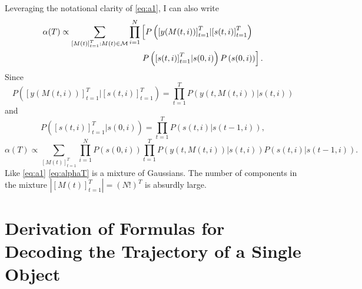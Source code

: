 \documentclass[12pt]{article}
\newcommand{\M}{{\cal M}}
\newcommand{\os}[4]{{\left[ #1(#2) \right]}_{#3}^{#4}} %
\newcommand{\ti}[2]{{#1}{(#2)}}                         %
\newcommand{\ts}[4]{\os{#1}{#2}{#2=#3}{#4}} %
\begin{document}
Leveraging the notational clarity of \eqref{eq:a1}, I can also write
\begin{align*}
  \ti{\alpha}{T} \propto \sum_{\os{M}{t}{t=1}{T}:\ti{M}{t}\in \M}
  \prod_{i=1}^N& \left[
  P\left( \os{y}{\ti{M}{t,i}}{t=1}{T} | \os{s}{t,i}{t=1}{T}\right) \right. \\
  & \left. P\left( \os{s}{t,i}{t=1}{T}| \ti{s}{0,i} \right)
  P\left( \ti{s}{0,i} \right) \right] .
\end{align*}
Since
\begin{equation*}
  P\left( \os{y}{\ti{M}{t,i}}{t=1}{T} | \os{s}{t,i}{t=1}{T}\right) =
  \prod_{t=1}^T P\left( \ti{y}{t,\ti{M}{t,i}} | \ti{s}{t,i}\right)
\end{equation*}
and
\begin{equation*}
  P\left( \os{s}{t,i}{t=1}{T}| \ti{s}{0,i} \right) = \prod_{t=1}^T
  P\left( \ti{s}{t,i} | \ti{s}{t-1,i}\right),
\end{equation*}
\begin{equation}
  \label{eq:alphaT}
  \ti{\alpha}{T} \propto \sum_{\os{M}{t}{t=1}{T}}
  \prod_{i=1}^N  P\left( \ti{s}{0,i} \right) \prod_{t=1}^T
  P\left( \ti{y}{t,\ti{M}{t,i}} | \ti{s}{t,i}\right)
  P\left( \ti{s}{t,i} | \ti{s}{t-1,i}\right).
\end{equation}
Like \eqref{eq:a1} \eqref{eq:alphaT} is a mixture of Gaussians.  The
number of components in the mixture $\left| \ts{M}{t}{1}{T}\right| =
(N!)^T$ is absurdly large.

\appendix
\section{Derivation of Formulas for Decoding the Trajectory of a Single Object}
\label{app:decode}
\end{document}
